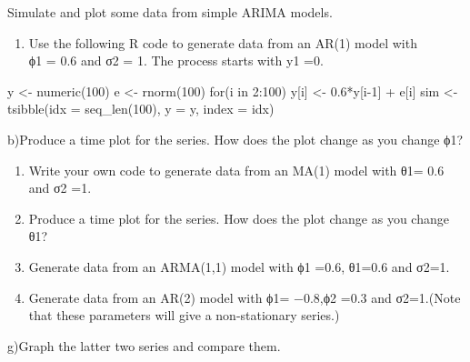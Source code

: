\documentclass[
]{article}
\providecommand{\tightlist}{%
  \setlength{\itemsep}{0pt}\setlength{\parskip}{0pt}}
\begin{document}
Simulate and plot some data from simple ARIMA models.

\begin{enumerate}
\def\labelenumi{\alph{enumi})}
\tightlist
\item
  Use the following R code to generate data from an AR(1) model with\\
  ϕ1 = 0.6 and σ2 = 1. The process starts with y1 =0.
\end{enumerate}

y \textless- numeric(100) e \textless- rnorm(100) for(i in 2:100)
y{[}i{]} \textless- 0.6*y{[}i-1{]} + e{[}i{]} sim \textless- tsibble(idx
= seq\_len(100), y = y, index = idx)

b)Produce a time plot for the series. How does the plot change as you
change ϕ1?

\begin{enumerate}
\def\labelenumi{\alph{enumi})}
\setcounter{enumi}{2}
\item
  Write your own code to generate data from an MA(1) model with θ1= 0.6
  and σ2 =1.
\item
  Produce a time plot for the series. How does the plot change as you
  change θ1?
\item
  Generate data from an ARMA(1,1) model with ϕ1 =0.6, θ1=0.6 and σ2=1.
\item
  Generate data from an AR(2) model with ϕ1= −0.8,ϕ2 =0.3 and σ2=1.(Note
  that these parameters will give a non-stationary series.)
\end{enumerate}

g)Graph the latter two series and compare them.
\end{document}
